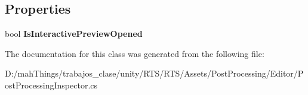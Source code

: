 \subsection*{Properties}
\begin{DoxyCompactItemize}
\item 
\mbox{\label{class_unity_editor_1_1_post_processing_1_1_post_processing_inspector_a95749af46df26c3932a587113daf1aa2}} 
bool {\bfseries Is\+Interactive\+Preview\+Opened}
\end{DoxyCompactItemize}


The documentation for this class was generated from the following file\+:\begin{DoxyCompactItemize}
\item 
D\+:/mah\+Things/trabajos\+\_\+clase/unity/\+R\+T\+S/\+R\+T\+S/\+Assets/\+Post\+Processing/\+Editor/Post\+Processing\+Inspector.\+cs\end{DoxyCompactItemize}
